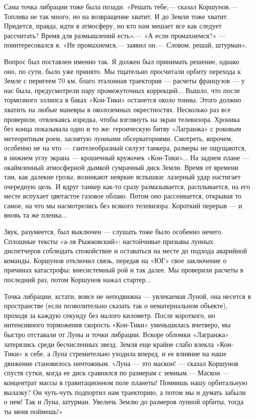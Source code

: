 \documentclass[11pt,a4paper,oneside]{article}
\begin{document}
Сама точка либрации тоже была позади. «Решать тебе,— сказал Коршунов.— Топлива не так много, но на возвращение хватит. И до Земли тоже хватит. Придется, правда, идти в атмосферу, но кто нам мешает все как следует рассчитать? Время для размышлений есть».— «А если промахнемся?» — поинтересовался я. «Не промахнемся,— заявил он.— Словом, решай, штурман».

Вопрос был поставлен именно так. Я должен был принимать решение, однако оно, по сути, было уже принято. Мы тщательно просчитали орбиту перехода к Земле с перигеем 70 км, благо эталонная траектория — расчеты французов — у нас была, предусмотрели пару промежуточных коррекций... Вышло, что после тормозного эллипса в баках «Кон-Тики» останется около тонны. Этого должно хватить на любые маневры в околоземных окрестностях. Несколько раз все проверили, отвлекаясь изредка, чтобы взглянуть на экран телевизора. Хроника без конца показывала одно и то же: героическую битву «Лагранжа» с роковым метеоритным роем, заснятую лунными обсерваториями. Смотреть, впрочем, особенно не на что — гантелеобразный силуэт танкера, размеры не ощущаются, в нижнем углу экрана — крошечный кружочек «Кон-Тики»... На заднем плане — окаймленный атмосферной дымкой сумрачный диск Земли. Время от времени там, как далекие грозы, возникают неяркие вспышки: лазерный удар настигает очередную цель. И вдруг танкер как-то сразу размазывается, расплывается, на его месте вспухает цветастое газовое облако. Потом оно рассеивается, открывая то самое, на что мы насмотрелись без всякого телевизора. Короткий перерыв — и вновь та же пленка...

Звук, разумеется, был выключен — слушать тоже было особенно нечего. Сплошные тексты «а-ля Рыжковский»: настойчивые призывы лунных диспетчеров соблюдать спокойствие и оставаться на месте до подхода аварийной команды. Коршунов отключил связь, передав на «ЮГ» свое заключение о причинах катастрофы: внесистемный рой и так далее. Мы проверили расчеты в последний раз, потом Коршунов нажал стартер...

Точка либрации, кстати, вовсе не неподвижна — увлекаемая Луной, она несется в пространстве (если позволительно сказать так о нематериальном объекте), проходя за каждую секунду без малого километр. После короткого, но интенсивного торможения скорость «Кон-Тики» уменьшилась вчетверо, мы быстро отставали от Луны и точки либрации. Вскоре обломки «Лагранжа» затерялись среди бесчисленных звезд. Земля еще крайне слабо влекла «Кон- Тики» к себе, а Луна стремительно уходила вперед, и ее влияние на наше движение становилось ничтожным. «Луна — это маскон! — сказал Коршунов спустя сутки, когда ее диск сравнялся по размерам с земным.— Маскон — концентрат массы в гравитационном поле планеты! Помнишь нашу орбитальную вылазку? Он чуть-чуть подпортил нам траекторию, а потом мы и думать забыли о нем! Так и Луна, штурман. Увеличь Землю до размеров лунной орбиты, тогда ты меня поймешь!»
\end{document}
